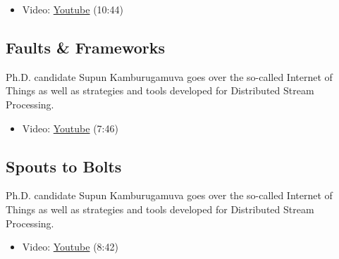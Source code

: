 \begin{itemize}

\item
  Video: \href{https://www.youtube.com/watch?v=Ok2Bo8D0EkE}{Youtube}
  (10:44)
\end{itemize}

\subsection{Faults \& Frameworks}\label{faults-frameworks}

Ph.D. candidate Supun Kamburugamuva goes over the so-called Internet of
Things as well as strategies and tools developed for Distributed Stream
Processing.

\begin{itemize}

\item
  Video: \href{https://www.youtube.com/watch?v=2ip9ttBMTlQ}{Youtube}
  (7:46)
\end{itemize}

\subsection{Spouts to Bolts}\label{spouts-to-bolts}

Ph.D. candidate Supun Kamburugamuva goes over the so-called Internet of
Things as well as strategies and tools developed for Distributed Stream
Processing.

\begin{itemize}

\item
  Video: \href{https://www.youtube.com/watch?v=E9E-ygRXcm8}{Youtube}
  (8:42)
\end{itemize}
